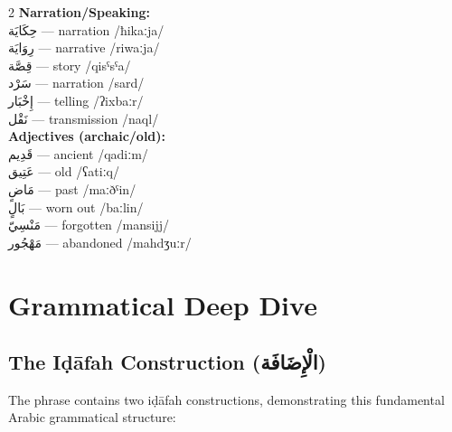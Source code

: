 \documentclass[letterpaper,12pt]{article}
\begin{document}
\begin{multicols}{2}
\textbf{Narration/Speaking:}\\
\textarabic{حِكَايَة} — narration /ħikaːja/\\
\textarabic{رِوَايَة} — narrative /riwaːja/\\
\textarabic{قِصَّة} — story /qisˤsˤa/\\
\textarabic{سَرْد} — narration /sard/\\
\textarabic{إِخْبَار} — telling /ʔixbaːr/\\
\textarabic{نَقْل} — transmission /naql/\\

\textbf{Adjectives (archaic/old):}\\
\textarabic{قَدِيم} — ancient /qadiːm/\\
\textarabic{عَتِيق} — old /ʕatiːq/\\
\textarabic{مَاضٍ} — past /maːðˤin/\\
\textarabic{بَالٍ} — worn out /baːlin/\\
\textarabic{مَنْسِيّ} — forgotten /mansijj/\\
\textarabic{مَهْجُور} — abandoned /mahdʒuːr/\\
\end{multicols}

\section{Grammatical Deep Dive}

\subsection{The Iḍāfah Construction (\textarabic{الْإِضَافَة})}

The phrase contains two iḍāfah constructions, demonstrating this fundamental Arabic grammatical structure:
\end{document}
